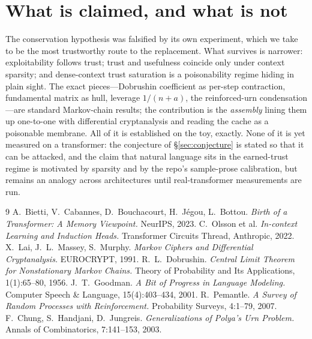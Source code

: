 \documentclass[11pt]{article}
\theoremstyle{plain}
\theoremstyle{definition}
\theoremstyle{remark}
\begin{document}
\section{What is claimed, and what is not}\label{sec:honesty}
The conservation hypothesis was falsified by its own experiment, which we take to be the most
trustworthy route to the replacement. What survives is narrower: exploitability follows
trust; trust and usefulness coincide only under context sparsity; and dense-context trust
saturation is a poisonability regime hiding in plain sight. The exact pieces---Dobrushin
coefficient as per-step contraction, fundamental matrix as hull, leverage $1/(n+a)$, the
reinforced-urn condensation---are standard Markov-chain results; the contribution is the
\emph{assembly} lining them up one-to-one with differential cryptanalysis and reading the
cache as a poisonable membrane. All of it is established on the toy, exactly. None of it is
yet measured on a transformer: the conjecture of \S\ref{sec:conjecture} is stated so that it
can be attacked, and the claim that natural language sits in the earned-trust regime is
motivated by sparsity and by the repo's sample-prose calibration, but remains an analogy across
architectures until real-transformer measurements are run.

\begin{thebibliography}{9}
 A.\ Bietti, V.\ Cabannes, D.\ Bouchacourt, H.\ J\'egou, L.\ Bottou.
\emph{Birth of a Transformer: A Memory Viewpoint.} NeurIPS, 2023.
 C.\ Olsson et al. \emph{In-context Learning and Induction Heads.}
Transformer Circuits Thread, Anthropic, 2022.
 X.\ Lai, J.\ L.\ Massey, S.\ Murphy. \emph{Markov Ciphers and Differential
Cryptanalysis.} EUROCRYPT, 1991.
 R.\ L.\ Dobrushin. \emph{Central Limit Theorem for Nonstationary
Markov Chains.} Theory of Probability and Its Applications, 1(1):65--80, 1956.
 J.\ T.\ Goodman. \emph{A Bit of Progress in Language Modeling.}
Computer Speech \& Language, 15(4):403--434, 2001.
 R.\ Pemantle. \emph{A Survey of Random Processes with Reinforcement.}
Probability Surveys, 4:1--79, 2007.
 F.\ Chung, S.\ Handjani, D.\ Jungreis. \emph{Generalizations of
Polya's Urn Problem.} Annals of Combinatorics, 7:141--153, 2003.
\end{thebibliography}
\end{document}
